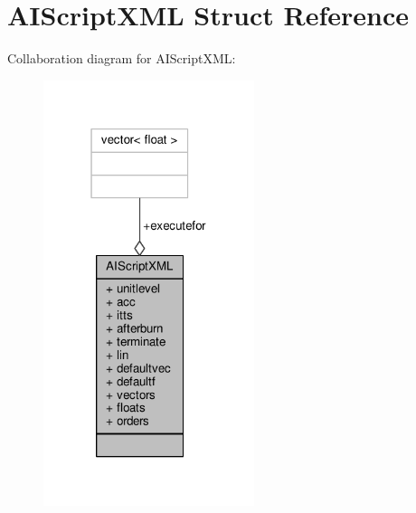 \hypertarget{structAIScriptXML}{}\section{A\+I\+Script\+X\+ML Struct Reference}
\label{structAIScriptXML}


Collaboration diagram for A\+I\+Script\+X\+ML\+:
\nopagebreak
\begin{figure}[H]
\begin{center}
\leavevmode
\includegraphics[width=175pt]{d2/d74/structAIScriptXML__coll__graph}
\end{center}
\end{figure}
